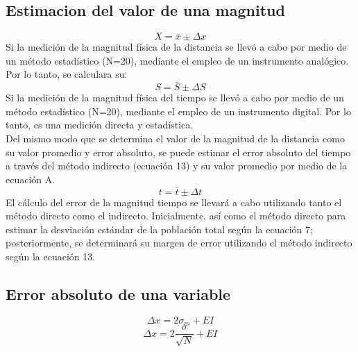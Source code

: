 \documentclass[runningheads]{llncs}
\begin{document}
    \subsection{Estimacion del valor de una magnitud}
    \begin{equation}
        X=\bar{x}\pm \Delta x
    \end{equation}
    Si la medición de la magnitud física de la distancia se llevó a cabo por medio de un método estadístico (N=20), mediante el empleo de un instrumento analógico. Por lo tanto, se calculara su:
    \begin{equation}
        S=\bar{S}\pm \Delta S
    \end{equation}
    Si la medición de la magnitud física del tiempo se llevó a cabo por medio de un método estadístico (N=20), mediante el empleo de un instrumento digital. Por lo tanto, es una medición directa y estadística. \\
    Del mismo modo que se determina el valor de la magnitud de la distancia como su valor promedio y error absoluto, se puede estimar el error absoluto del tiempo a través del método indirecto (ecuación 13) y su valor promedio por medio de la ecuación A.\\
    \begin{equation}
        t=\bar{t}\pm \Delta t
    \end{equation}
    El cálculo del error de la magnitud tiempo se llevará a cabo utilizando tanto el método directo como el indirecto. Inicialmente, así como el método directo para estimar la desviación estándar de la población total según la ecuación 7; posteriormente, se determinará su margen de error utilizando el método indirecto según la ecuación 13.\\
    \subsection{Error absoluto de una variable}
    \begin{equation}
        \Delta x=2\sigma_{m}+EI
    \end{equation}
    \begin{equation}
        \Delta x=2\frac{\sigma}{\sqrt{N}}+EI
    \end{equation}
\end{document}
